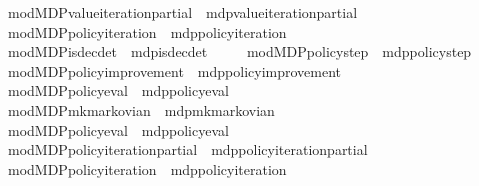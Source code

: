 \begin{isabellebody}
\ \ \ \ \ mod{\isacharunderscore}{\kern0pt}MDP{\isacharunderscore}{\kern0pt}value{\isacharunderscore}{\kern0pt}iteration{\isacharunderscore}{\kern0pt}partial\ {\isacharequal}{\kern0pt}\ mdp{\isachardot}{\kern0pt}value{\isacharunderscore}{\kern0pt}iteration{\isacharunderscore}{\kern0pt}partial\isanewline
\ \ \ \ \ mod{\isacharunderscore}{\kern0pt}MDP{\isacharunderscore}{\kern0pt}policy{\isacharunderscore}{\kern0pt}iteration\ {\isacharequal}{\kern0pt}\ mdp{\isachardot}{\kern0pt}policy{\isacharunderscore}{\kern0pt}iteration\isanewline
\ \ \ \ \ mod{\isacharunderscore}{\kern0pt}MDP{\isacharunderscore}{\kern0pt}is{\isacharunderscore}{\kern0pt}dec{\isacharunderscore}{\kern0pt}det\ {\isacharequal}{\kern0pt}\ mdp{\isachardot}{\kern0pt}is{\isacharunderscore}{\kern0pt}dec{\isacharunderscore}{\kern0pt}det\isanewline
\ \ \ \ \ mod{\isacharunderscore}{\kern0pt}MDP{\isacharunderscore}{\kern0pt}policy{\isacharunderscore}{\kern0pt}step\ {\isacharequal}{\kern0pt}\ mdp{\isachardot}{\kern0pt}policy{\isacharunderscore}{\kern0pt}step\isanewline
\ \ \ \ \ mod{\isacharunderscore}{\kern0pt}MDP{\isacharunderscore}{\kern0pt}policy{\isacharunderscore}{\kern0pt}improvement\ {\isacharequal}{\kern0pt}\ mdp{\isachardot}{\kern0pt}policy{\isacharunderscore}{\kern0pt}improvement\isanewline
\ \ \ \ \ mod{\isacharunderscore}{\kern0pt}MDP{\isacharunderscore}{\kern0pt}policy{\isacharunderscore}{\kern0pt}eval\ {\isacharequal}{\kern0pt}\ mdp{\isachardot}{\kern0pt}policy{\isacharunderscore}{\kern0pt}eval\isanewline
\ \ \ \ \ mod{\isacharunderscore}{\kern0pt}MDP{\isacharunderscore}{\kern0pt}mk{\isacharunderscore}{\kern0pt}markovian\ {\isacharequal}{\kern0pt}\ mdp{\isachardot}{\kern0pt}mk{\isacharunderscore}{\kern0pt}markovian\isanewline
\ \ \ \ \ mod{\isacharunderscore}{\kern0pt}MDP{\isacharunderscore}{\kern0pt}policy{\isacharunderscore}{\kern0pt}eval{\isacharprime}{\kern0pt}\ {\isacharequal}{\kern0pt}\ mdp{\isachardot}{\kern0pt}policy{\isacharunderscore}{\kern0pt}eval{\isacharprime}{\kern0pt}\isanewline
\ \ \ \ \ mod{\isacharunderscore}{\kern0pt}MDP{\isacharunderscore}{\kern0pt}policy{\isacharunderscore}{\kern0pt}iteration{\isacharunderscore}{\kern0pt}partial{\isacharprime}{\kern0pt}\ {\isacharequal}{\kern0pt}\ mdp{\isachardot}{\kern0pt}policy{\isacharunderscore}{\kern0pt}iteration{\isacharunderscore}{\kern0pt}partial{\isacharprime}{\kern0pt}\isanewline
\ \ \ \ \ mod{\isacharunderscore}{\kern0pt}MDP{\isacharunderscore}{\kern0pt}policy{\isacharunderscore}{\kern0pt}iteration{\isacharprime}{\kern0pt}\ {\isacharequal}{\kern0pt}\ mdp{\isachardot}{\kern0pt}policy{\isacharunderscore}{\kern0pt}iteration{\isacharprime}{\kern0pt}\isanewline

\end{isabellebody}
